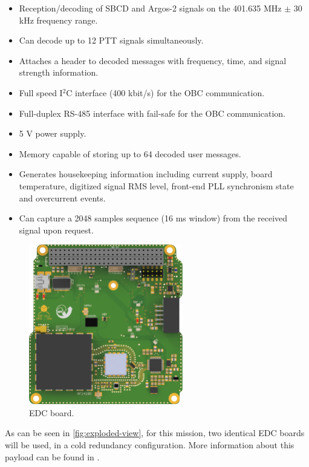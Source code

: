 \begin{itemize}
    \item Reception/decoding of SBCD and Argos-2 signals on the 401.635 MHz $\pm$ 30 kHz frequency range.
    \item Can decode up to 12 PTT signals simultaneously.
    \item Attaches a header to decoded messages with frequency, time, and signal strength information.
    \item Full speed I$^{2}$C interface (400 kbit/s) for the OBC communication.
    \item Full-duplex RS-485 interface with fail-safe for the OBC communication.
    \item 5 V power supply.
    \item Memory capable of storing up to 64 decoded user messages.
    \item Generates housekeeping information including current supply, board temperature, digitized signal RMS level, front-end PLL synchronism state and overcurrent events.
    \item Can capture a 2048 samples sequence (16 ms window) from the received signal upon request.
\end{itemize}

\begin{figure}[!ht]
    \begin{center}
        \includegraphics[width=0.6\textwidth]{figures/edc-pcb-top}
        \caption{EDC board.}
        \label{fig:edc-board}
    \end{center}
\end{figure}

As can be seen in \autoref{fig:exploded-view}, for this mission, two identical EDC boards will be used, in a cold redundancy configuration. More information about this payload can be found in \cite{edc}.

